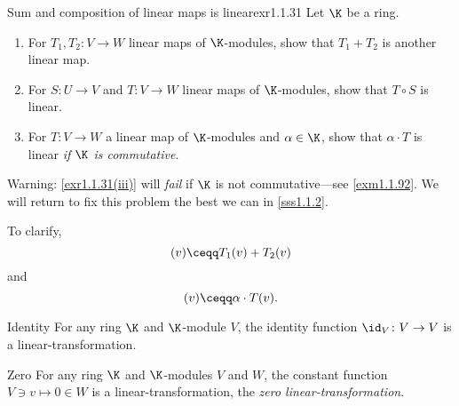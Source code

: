 \begin{exr}{Sum and composition of linear maps is linear}{exr1.1.31}
	Let $\K$ be a ring.
	\begin{enumerate}
		\item \label{exr1.1.31(i)}For $T_1,T_2\colon V\rightarrow W$ linear maps of $\K$-modules, show that $T_1+T_2$ is another linear map.
		\item \label{exr1.1.31(ii)}For $S\colon U\rightarrow V$ and $T\colon V\rightarrow W$ linear maps of $\K$-modules, show that $T\circ S$ is linear.
		\item \label{exr1.1.31(iii)}For $T\colon V\rightarrow W$ a linear map of $\K$-modules and $\alpha \in \K$, show that $\alpha \cdot T$ is linear \emph{if $\K$ is commutative}.
	\end{enumerate}
	\begin{rmk}
		Warning:  \cref{exr1.1.31(iii)} will \emph{fail} if $\K$ is not commutative---see \cref{exm1.1.92}.  We will return to fix this problem the best we can in \cref{sss1.1.2}.
	\end{rmk}
	\begin{rmk}
		To clarify,
		\begin{equation}
			[T_1+T_2](v)\ceqq T_1(v)+T_2(v)
		\end{equation}
		and
		\begin{equation}
			[\alpha \cdot T](v)\ceqq \alpha \cdot T(v).
		\end{equation}
	\end{rmk}
\end{exr}
\begin{exm}{Identity}{}
	For any ring $\K$ and $\K$-module $V$, the identity function $\id _V\colon V\rightarrow V$ is a linear-transformation.
\end{exm}
\begin{exm}{Zero}{}
	For any ring $\K$ and $\K$-modules $V$ and $W$, the constant function $V\ni v\mapsto 0\in W$ is a linear-transformation, the \emph{zero linear-transformation}.
\end{exm}
